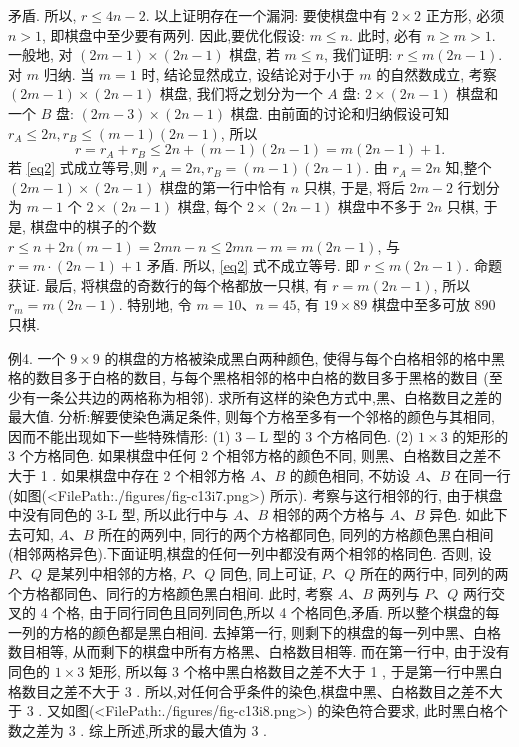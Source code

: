 矛盾.
所以, $r \leqslant 4 n-2$.
以上证明存在一个漏洞: 要使棋盘中有 $2 \times 2$ 正方形, 必须 $n>1$, 即棋盘中至少要有两列.
因此,要优化假设: $m \leqslant n$. 此时, 必有 $n \geqslant m>1$.
一般地, 对 $(2 m-1) \times(2 n-1)$ 棋盘, 若 $m \leqslant n$, 我们证明: $r \leqslant m(2 n-1)$. 
对 $m$ 归纳.
当 $m=1$ 时, 结论显然成立, 设结论对于小于 $m$ 的自然数成立, 考察 $(2 m-1) \times(2 n-1)$ 棋盘, 我们将之划分为一个 $A$ 盘: $2 \times(2 n-1)$ 棋盘和一个 $B$ 盘: $(2 m-3) \times(2 n-1)$ 棋盘.
由前面的讨论和归纳假设可知 $r_A \leqslant 2 n, r_B \leqslant(m-1)(2 n-1)$, 所以
$$
r=r_A+r_B \leqslant 2 n+(m-1)(2 n-1)=m(2 n-1)+1 . \label{eq2}
$$
若 \ref{eq2} 式成立等号,则 $r_A=2 n, r_B=(m-1)(2 n-1)$. 由 $r_A=2 n$ 知,整个 $(2 m-1) \times(2 n-1)$ 棋盘的第一行中恰有 $n$ 只棋, 于是, 将后 $2 m-2$ 行划分为
$m-1$ 个 $2 \times(2 n-1)$ 棋盘, 每个 $2 \times(2 n-1)$ 棋盘中不多于 $2 n$ 只棋, 于是, 棋盘中的棋子的个数 $r \leqslant n+2 n(m-1)=2 m n-n \leqslant 2 m n-m=m(2 n-1)$, 与 $r=m \cdot(2 n-1)+1$ 矛盾.
所以, \ref{eq2} 式不成立等号.
即 $r \leqslant m(2 n-1)$. 命题获证.
最后, 将棋盘的奇数行的每个格都放一只棋, 有 $r=m(2 n-1)$, 所以 $r_m=m(2 n-1)$. 特别地, 令 $m=10 、 n=45$, 有 $19 \times 89$ 棋盘中至多可放 890 只棋.



例4. 一个 $9 \times 9$ 的棋盘的方格被染成黑白两种颜色, 使得与每个白格相邻的格中黑格的数目多于白格的数目, 与每个黑格相邻的格中白格的数目多于黑格的数目 (至少有一条公共边的两格称为相邻). 求所有这样的染色方式中,黑、白格数目之差的最大值.
分析:解要使染色满足条件, 则每个方格至多有一个邻格的颜色与其相同, 因而不能出现如下一些特殊情形: (1) $3-\mathrm{L}$ 型的 3 个方格同色.
(2) $1 \times 3$ 的矩形的 3 个方格同色.
如果棋盘中任何 2 个相邻方格的颜色不同, 则黑、白格数目之差不大于 1 .
如果棋盘中存在 2 个相邻方格 $A 、 B$ 的颜色相同, 不妨设 $A 、 B$ 在同一行 (如图(<FilePath:./figures/fig-c13i7.png>) 所示). 考察与这行相邻的行, 由于棋盘中没有同色的 3-L 型, 所以此行中与 $A 、 B$ 相邻的两个方格与 $A 、 B$ 异色.
如此下去可知, $A 、 B$ 所在的两列中, 同行的两个方格都同色, 同列的方格颜色黑白相间 (相邻两格异色).下面证明,棋盘的任何一列中都没有两个相邻的格同色.
否则, 设 $P 、 Q$ 是某列中相邻的方格, $P 、 Q$ 同色, 同上可证, $P 、 Q$ 所在的两行中, 同列的两个方格都同色、同行的方格颜色黑白相间.
此时, 考察 $A 、 B$ 两列与 $P 、 Q$ 两行交叉的 4 个格, 由于同行同色且同列同色,所以 4 个格同色,矛盾.
所以整个棋盘的每一列的方格的颜色都是黑白相间.
去掉第一行, 则剩下的棋盘的每一列中黑、白格数目相等, 从而剩下的棋盘中所有方格黑、白格数目相等.
而在第一行中, 由于没有同色的 $1 \times 3$ 矩形, 所以每 3 个格中黑白格数目之差不大于 1 , 于是第一行中黑白格数目之差不大于 3 .
所以,对任何合乎条件的染色,棋盘中黑、白格数目之差不大于 3 . 又如图(<FilePath:./figures/fig-c13i8.png>) 的染色符合要求, 此时黑白格个数之差为 3 .
综上所述,所求的最大值为 3 .



